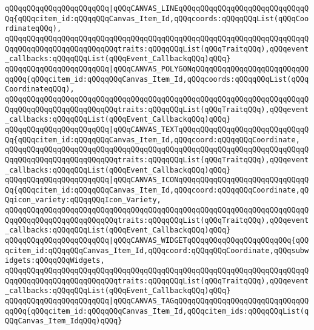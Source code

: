 \verb|qQQqqQQqqQQqqQQqqQQqqQQq|\verb#|qQQqCANVAS_LINEqQQqqQQqqQQqqQQqqQQqqQQqqQQqqQQq{qQQqcitem_id:qQQqqQQqCanvas_Item_Id,qQQqcoords:qQQqqQQqList(qQQqCoordinateqQQq),#\newline
\verb|qQQqqQQqqQQqqQQqqQQqqQQqqQQqqQQqqQQqqQQqqQQqqQQqqQQqqQQqqQQqqQQqqQQqqQQqqQQqqQQqqQQqqQQqqQQqqQQqtraits:qQQqqQQqList(qQQqTraitqQQq),qQQqevent_callbacks:qQQqqQQqList(qQQqEvent_CallbackqQQq)qQQq}|\newline
\verb|qQQqqQQqqQQqqQQqqQQqqQQq|\verb#|qQQqCANVAS_POLYGONqQQqqQQqqQQqqQQqqQQqqQQqqQQqqQQq{qQQqcitem_id:qQQqqQQqCanvas_Item_Id,qQQqcoords:qQQqqQQqList(qQQqCoordinateqQQq),#\newline
\verb|qQQqqQQqqQQqqQQqqQQqqQQqqQQqqQQqqQQqqQQqqQQqqQQqqQQqqQQqqQQqqQQqqQQqqQQqqQQqqQQqqQQqqQQqqQQqqQQqtraits:qQQqqQQqList(qQQqTraitqQQq),qQQqevent_callbacks:qQQqqQQqList(qQQqEvent_CallbackqQQq)qQQq}|\newline
\verb|qQQqqQQqqQQqqQQqqQQqqQQq|\verb#|qQQqCANVAS_TEXTqQQqqQQqqQQqqQQqqQQqqQQqqQQqqQQq{qQQqcitem_id:qQQqqQQqCanvas_Item_Id,qQQqcoord:qQQqqQQqCoordinate,#\newline
\verb|qQQqqQQqqQQqqQQqqQQqqQQqqQQqqQQqqQQqqQQqqQQqqQQqqQQqqQQqqQQqqQQqqQQqqQQqqQQqqQQqqQQqqQQqqQQqqQQqtraits:qQQqqQQqList(qQQqTraitqQQq),qQQqevent_callbacks:qQQqqQQqList(qQQqEvent_CallbackqQQq)qQQq}|\newline
\verb|qQQqqQQqqQQqqQQqqQQqqQQq|\verb#|qQQqCANVAS_ICONqQQqqQQqqQQqqQQqqQQqqQQqqQQqqQQq{qQQqcitem_id:qQQqqQQqCanvas_Item_Id,qQQqcoord:qQQqqQQqCoordinate,qQQqicon_variety:qQQqqQQqIcon_Variety,#\newline
\verb|qQQqqQQqqQQqqQQqqQQqqQQqqQQqqQQqqQQqqQQqqQQqqQQqqQQqqQQqqQQqqQQqqQQqqQQqqQQqqQQqqQQqqQQqqQQqqQQqtraits:qQQqqQQqList(qQQqTraitqQQq),qQQqevent_callbacks:qQQqqQQqList(qQQqEvent_CallbackqQQq)qQQq}|\newline
\verb|qQQqqQQqqQQqqQQqqQQqqQQq|\verb#|qQQqCANVAS_WIDGETqQQqqQQqqQQqqQQqqQQqqQQq{qQQqcitem_id:qQQqqQQqCanvas_Item_Id,qQQqcoord:qQQqqQQqCoordinate,qQQqsubwidgets:qQQqqQQqWidgets,#\newline
\verb|qQQqqQQqqQQqqQQqqQQqqQQqqQQqqQQqqQQqqQQqqQQqqQQqqQQqqQQqqQQqqQQqqQQqqQQqqQQqqQQqqQQqqQQqqQQqqQQqtraits:qQQqqQQqList(qQQqTraitqQQq),qQQqevent_callbacks:qQQqqQQqList(qQQqEvent_CallbackqQQq)qQQq}|\newline
\verb|qQQqqQQqqQQqqQQqqQQqqQQq|\verb#|qQQqCANVAS_TAGqQQqqQQqqQQqqQQqqQQqqQQqqQQqqQQqqQQq{qQQqcitem_id:qQQqqQQqCanvas_Item_Id,qQQqcitem_ids:qQQqqQQqList(qQQqCanvas_Item_IdqQQq)qQQq}#\newline
\newline
